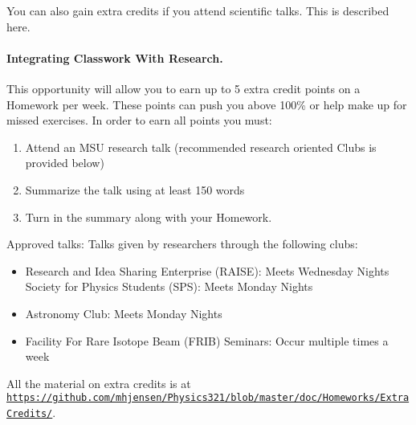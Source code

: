 \documentclass[%
oneside,                 %
final,                   %
10pt]{article}
\begin{document}
\noindent
You can also gain extra credits if you attend scientific talks.
This is described here.

\paragraph{Integrating Classwork With Research.}
This opportunity will allow you to earn up to 5 extra credit points on a Homework per week. These points can push you above 100\% or help make up for missed exercises.
In order to earn all points you must:

\begin{enumerate}
\item Attend an MSU research talk (recommended research oriented Clubs is  provided below)

\item Summarize the talk using at least 150 words

\item Turn in the summary along with your Homework.
\end{enumerate}

\noindent
Approved talks:
Talks given by researchers through the following clubs:
\begin{itemize}
\item Research and Idea Sharing Enterprise (RAISE)​: Meets Wednesday Nights Society for Physics Students (SPS)​: Meets Monday Nights

\item Astronomy Club​: Meets Monday Nights

\item Facility For Rare Isotope Beam (FRIB) Seminars: ​Occur multiple times a week
\end{itemize}

\noindent
All the material on extra credits is at \href{{https://github.com/mhjensen/Physics321/blob/master/doc/Homeworks/ExtraCredits/}}{\nolinkurl{https://github.com/mhjensen/Physics321/blob/master/doc/Homeworks/ExtraCredits/}}. 



\end{document}
